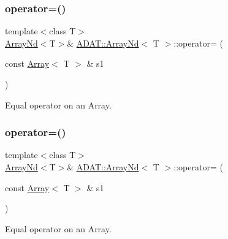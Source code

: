 \subsubsection{\texorpdfstring{operator=()}{operator=()}\hspace{0.1cm}{\footnotesize\ttfamily [5/15]}}
{\footnotesize\ttfamily template$<$class T$>$ \\
\mbox{\hyperlink{classADAT_1_1ArrayNd}{Array\+Nd}}$<$T$>$\& \mbox{\hyperlink{classADAT_1_1ArrayNd}{A\+D\+A\+T\+::\+Array\+Nd}}$<$ T $>$\+::operator= (\begin{DoxyParamCaption}\item[{const \mbox{\hyperlink{classXMLArray_1_1Array}{Array}}$<$ T $>$ \&}]{s1 }\end{DoxyParamCaption})\hspace{0.3cm}{\ttfamily [inline]}}



Equal operator on an Array. 

\mbox{\label{classADAT_1_1ArrayNd_a3290ebbe75b40ebde8f3506f2aea64a5}} 
\subsubsection{\texorpdfstring{operator=()}{operator=()}\hspace{0.1cm}{\footnotesize\ttfamily [6/15]}}
{\footnotesize\ttfamily template$<$class T$>$ \\
\mbox{\hyperlink{classADAT_1_1ArrayNd}{Array\+Nd}}$<$T$>$\& \mbox{\hyperlink{classADAT_1_1ArrayNd}{A\+D\+A\+T\+::\+Array\+Nd}}$<$ T $>$\+::operator= (\begin{DoxyParamCaption}\item[{const \mbox{\hyperlink{classXMLArray_1_1Array}{Array}}$<$ T $>$ \&}]{s1 }\end{DoxyParamCaption})\hspace{0.3cm}{\ttfamily [inline]}}



Equal operator on an Array. 

\mbox{\label{classADAT_1_1ArrayNd_a95293530c9643394ae8133f0203d342b}} 
